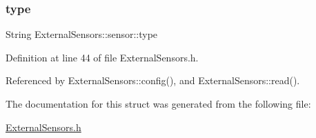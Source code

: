 \subsubsection{\texorpdfstring{type}{type}}
{\footnotesize\ttfamily String External\+Sensors\+::sensor\+::type}



Definition at line 44 of file External\+Sensors.\+h.



Referenced by External\+Sensors\+::config(), and External\+Sensors\+::read().



The documentation for this struct was generated from the following file\+:\begin{DoxyCompactItemize}
\item 
\hyperlink{ExternalSensors_8h}{External\+Sensors.\+h}\end{DoxyCompactItemize}
